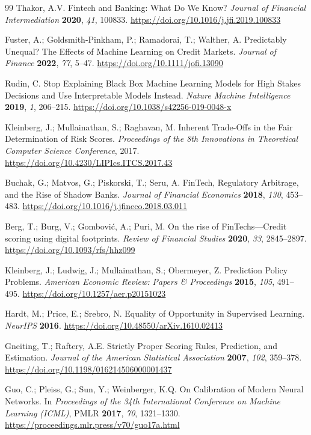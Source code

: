\documentclass[10pt]{article}
\begin{document}
\begin{thebibliography}{99}
Thakor, A.V. Fintech and Banking: What Do We Know? \textit{Journal of Financial Intermediation} \textbf{2020}, \textit{41}, 100833. \url{https://doi.org/10.1016/j.jfi.2019.100833}

Fuster, A.; Goldsmith-Pinkham, P.; Ramadorai, T.; Walther, A. Predictably Unequal? The Effects of Machine Learning on Credit Markets. \textit{Journal of Finance} \textbf{2022}, \textit{77}, 5--47. \url{https://doi.org/10.1111/jofi.13090}

Rudin, C. Stop Explaining Black Box Machine Learning Models for High Stakes Decisions and Use Interpretable Models Instead. \textit{Nature Machine Intelligence} \textbf{2019}, \textit{1}, 206--215. \url{https://doi.org/10.1038/s42256-019-0048-x}

Kleinberg, J.; Mullainathan, S.; Raghavan, M. Inherent Trade-Offs in the Fair Determination of Risk Scores. \textit{Proceedings of the 8th Innovations in Theoretical Computer Science Conference}, 2017. \url{https://doi.org/10.4230/LIPIcs.ITCS.2017.43}

Buchak, G.; Matvos, G.; Piskorski, T.; Seru, A. FinTech, Regulatory Arbitrage, and the Rise of Shadow Banks. \textit{Journal of Financial Economics} \textbf{2018}, \textit{130}, 453--483. \url{https://doi.org/10.1016/j.jfineco.2018.03.011}

Berg, T.; Burg, V.; Gombović, A.; Puri, M. On the rise of FinTechs—Credit scoring using digital footprints. \textit{Review of Financial Studies} \textbf{2020}, \textit{33}, 2845--2897. \url{https://doi.org/10.1093/rfs/hhz099}

Kleinberg, J.; Ludwig, J.; Mullainathan, S.; Obermeyer, Z. Prediction Policy Problems. \textit{American Economic Review: Papers \& Proceedings} \textbf{2015}, \textit{105}, 491--495. \url{https://doi.org/10.1257/aer.p20151023}

Hardt, M.; Price, E.; Srebro, N. Equality of Opportunity in Supervised Learning. \textit{NeurIPS} \textbf{2016}. \url{https://doi.org/10.48550/arXiv.1610.02413}

Gneiting, T.; Raftery, A.E. Strictly Proper Scoring Rules, Prediction, and Estimation. \textit{Journal of the American Statistical Association} \textbf{2007}, \textit{102}, 359--378. \url{https://doi.org/10.1198/016214506000001437}

Guo, C.; Pleiss, G.; Sun, Y.; Weinberger, K.Q. On Calibration of Modern Neural Networks. In \textit{Proceedings of the 34th International Conference on Machine Learning (ICML)}, PMLR \textbf{2017}, \textit{70}, 1321--1330. \url{https://proceedings.mlr.press/v70/guo17a.html}


\end{thebibliography}
\end{document}
